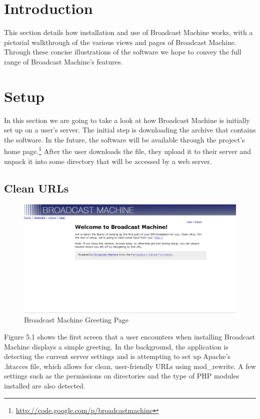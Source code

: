 \documentclass[a4paper,12pt]{report}
\begin{document}
\section{Introduction}
This section details how installation and use of Broadcast Machine works, with a pictorial walkthrough of the various views and pages of Broadcast Machine. 
Through these concise illustrations of the software we hope to convey the full range of Broadcast Machine's features.

\section{Setup}
In this section we are going to take a look at how Broadcast Machine is initially set up on a user's server.
The initial step is downloading the archive that contains the software.
In the future, the software will be available through the project's home page.\footnote{\url{http://code.google.com/p/broadcastmachine}}
After the user downloads the file, they upload it to their server and unpack it into some directory that will be accessed by a web server.

\subsection{Clean URLs}
  \begin{figure}[htp]
  \begin{center}
  \includegraphics[width=150mm]{./images/setup1.png}
  \caption{Broadcast Machine Greeting Page}
  \end{center}
  \end{figure}
Figure 5.1 shows the first screen that a user encounters when installing Broadcast Machine displays a simple greeting.
In the background, the application is detecting the current server settings and is attempting to set up Apache's .htacces file, which allows for clean, user-friendly URLs using mod\_rewrite.
A few settings such as the permissions on directories and the type of PHP modules installed are also detected.
\end{document}
